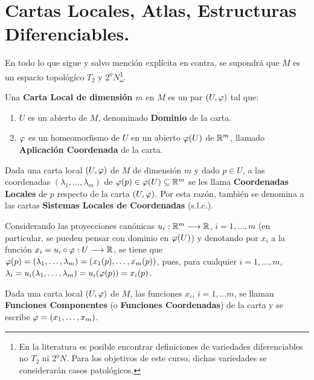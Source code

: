 \documentclass[cursovd_portada.tex]{subfiles}
\begin{document}
\section{Cartas Locales, Atlas, Estructuras Diferenciables.}
\hs En todo lo que sigue y salvo mención explícita en
contra, se supondrá que $M$ es un espacio topológíco
$T_2$ y $2^{\underline{o}}N$\footnote{En la literatura es posible
encontrar definiciones de variedades diferenciables no $T_2$ ni
$2^{\underline{o}}N$. Para los objetivos de este curso, dichas
variedades se considerarán casos patológicos.}.
\begin{defi}
Una {\bf Carta Local de dimensión $m$} en $M$ es un par $(U,\varphi)$ tal que:
\begin{enumerate}
\item $U$ es un abierto de $M$, denominado {\bf Dominio} de la carta.
\item $\varphi$ es un homeomorfismo de $U$ en un abierto $\varphi(U)$ de $\mathbb{R}^m$, llamado {\bf Aplicación Coordenada} de la
carta.
\end{enumerate}
\end{defi}
\begin{defi}
Dada una carta local $(U,\varphi)$ de $M$ de dimensión $m$ y dado $p\in U$, a las coordenadas $(\lambda_1,\dots
,\lambda_m)$ de $\varphi(p)\in\varphi(U)\subseteq\mathbb{R}^m$ se les llama {\bf Coordenadas Locales} de $p$ respecto de la carta
$(U,\varphi)$. Por esta razón, también se denomina a las cartas {\bf Sistemas Locales de Coordenadas} (s.l.c.).
\end{defi}
Considerando las proyecciones canónicas $u_i:\mathbb{R}^m\longrightarrow\mathbb{R}$,
$i=1,\dots ,m$ (en particular, se pueden pensar con dominio en
$\varphi(U)$) y denotando por $x_i$ a la función
$x_i=u_i\circ\varphi:U\longrightarrow\mathbb{R}$, se tiene que $\varphi(p)=(\lambda_1,\dots
,\lambda_m)=(x_1(p),\dots ,x_m(p))$, pues, para cualquier
$i=1,\dots ,m$, $\lambda_i=u_i(\lambda_1,\dots
,\lambda_m)=u_i(\varphi(p))=x_i(p)$.
\begin{defi}
Dada una carta local $(U,\varphi)$ de $M$, las funciones $x_i$,
$i=1,\dots m$, se llaman {\bf Funciones Componentes} (o {\bf
Funciones Coordenadas}) de la carta y se escribe $\varphi=(x_1,\dots
,x_m)$.
\end{defi}
\end{document}
